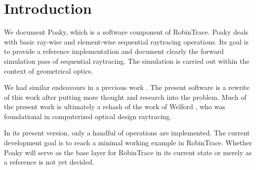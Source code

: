 \section{Introduction}
We document Poaky, which is a software component of RobinTrace. Poaky deals
with basic ray-wise and element-wise sequential raytracing operations. Its
goal is to provide a reference implementation and document clearly the
forward simulation pass of sequential raytracing. The simulation is carried
out within the context of geometrical optics.

We had similar endeavours in a previous work \cite{Houllier-thesis}.
The present software is a rewrite of this work after putting more thought and
research into the problem. Much of the present work is ultimately a rehash of
the work of Welford \cite{Welford:1986}, who was foundational in computerized
optical design raytracing.

In its present version, only a handful of operations are implemented. The
current development goal is to reach a minimal working example in RobinTrace.
Whether Poaky will serve as the base layer for RobinTrace in its current state
or merely as a reference is not yet decided.
